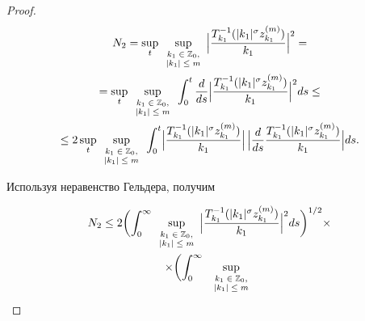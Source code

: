 \begin{proof}
\begin{multline*}

N_2=

\sup_{t}\sup_{\scriptsize \begin{array}{c} k_1\in \mathbb Z_0, \\ |k_1|\le m \end{array}} 

\Bigl|\frac{T^{-1}_{k_1}(|k_1|^\sigma z_{k_1}^{(m)})}{k_1}\Bigr|^2 = 

\\

=\sup_{t}\sup_{\scriptsize \begin{array}{c} k_1\in \mathbb Z_0, \\ |k_1|\le m \end{array}} 

\int_0^t\frac{d}{ds} \Bigl|\frac{T^{-1}_{k_1}(|k_1|^\sigma z_{k_1}^{(m)})}{k_1} \Bigr|^2ds\le 

\\

\le 2\sup_{t}\sup_{\scriptsize \begin{array}{c} k_1\in \mathbb Z_0, \\ |k_1|\le m \end{array}}  \int_0^t 

\Bigl|\frac{T^{-1}_{k_1}(|k_1|^\sigma z_{k_1}^{(m)})}{k_1} \Bigr|\,

\Bigl|\frac{d}{ds}\frac{T^{-1}_{k_1}(|k_1|^\sigma z_{k_1}^{(m)})}{k_1} \Bigr|ds.

\end{multline*}

Используя  неравенство Гельдера, получим

\begin{multline*}

N_2\le 2 \biggl( \int_0^\infty\sup_{\scriptsize \begin{array}{c} k_1\in \mathbb Z_0, \\ |k_1|\le m \end{array}}

\Bigl|\frac{T^{-1}_{k_1}(|k_1|^\sigma z_{k_1}^{(m)})}{k_1} \Bigr|^2ds\biggr)^{1/2}\times

\\

\times

\biggl(

\int_0^\infty\ \sup_{\scriptsize \begin{array}{c} k_1\in \mathbb Z_0, \\ |k_1|\le m \end{array}}


\end{multline*}
\end{proof}
